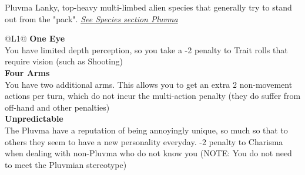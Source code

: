 \begin{genericsection}{Pluvma}
  Lanky, top-heavy multi-limbed alien species that generally try to stand out from the "pack". \textit{\hyperref[sec:specie-pluvma]{See Species section Pluvma}}
\end{genericsection}
\begin{redtable}{\linewidth}{@{}L{1}@{}}
  \textbf{One Eye}\\
  You have limited depth perception, so you take a -2 penalty to Trait rolls that require vision (such as Shooting)\\
  \textbf{Four Arms}\\
  You have two additional arms. This allows you to get an extra 2 non-movement actions per turn, which do not incur the multi-action penalty (they do suffer from off-hand and other penalties)\\
  \textbf{Unpredictable}\\
  The Pluvma have a reputation of being annoyingly unique, so much so that to others they seem to have a new personality everyday. -2 penalty to Charisma when dealing with non-Pluvma who do not know you (NOTE: You do not need to meet the Pluvmian stereotype)\\
\end{redtable}
  
